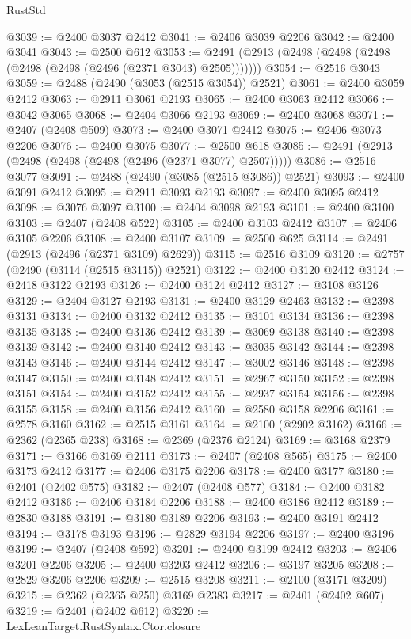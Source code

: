 \begin{lexlean}{RustStd}
\begin{coremodule}
{\begin{coremodule}
{{{{{{{{{{{{{{{{{{{{{{{{{{{{{{{{{{{{{{{{{{{{{{{{{{@3039 := @2400 @3037 @2412
@3041 := @2406 @3039 @2206
@3042 := @2400 @3041
@3043 := @2500 @612
@3053 := @2491 (@2913 (@2498 (@2498 (@2498 (@2498 (@2498 (@2496 (@2371 @3043) @2505)))))))
@3054 := @2516 @3043
@3059 := @2488 (@2490 (@3053 (@2515 @3054)) @2521)
@3061 := @2400 @3059 @2412
@3063 := @2911 @3061 @2193
@3065 := @2400 @3063 @2412
@3066 := @3042 @3065
@3068 := @2404 @3066 @2193
@3069 := @2400 @3068
@3071 := @2407 (@2408 @509)
@3073 := @2400 @3071 @2412
@3075 := @2406 @3073 @2206
@3076 := @2400 @3075
@3077 := @2500 @618
@3085 := @2491 (@2913 (@2498 (@2498 (@2498 (@2496 (@2371 @3077) @2507)))))
@3086 := @2516 @3077
@3091 := @2488 (@2490 (@3085 (@2515 @3086)) @2521)
@3093 := @2400 @3091 @2412
@3095 := @2911 @3093 @2193
@3097 := @2400 @3095 @2412
@3098 := @3076 @3097
@3100 := @2404 @3098 @2193
@3101 := @2400 @3100
@3103 := @2407 (@2408 @522)
@3105 := @2400 @3103 @2412
@3107 := @2406 @3105 @2206
@3108 := @2400 @3107
@3109 := @2500 @625
@3114 := @2491 (@2913 (@2496 (@2371 @3109) @2629))
@3115 := @2516 @3109
@3120 := @2757 (@2490 (@3114 (@2515 @3115)) @2521)
@3122 := @2400 @3120 @2412
@3124 := @2418 @3122 @2193
@3126 := @2400 @3124 @2412
@3127 := @3108 @3126
@3129 := @2404 @3127 @2193
@3131 := @2400 @3129 @2463
@3132 := @2398 @3131
@3134 := @2400 @3132 @2412
@3135 := @3101 @3134
@3136 := @2398 @3135
@3138 := @2400 @3136 @2412
@3139 := @3069 @3138
@3140 := @2398 @3139
@3142 := @2400 @3140 @2412
@3143 := @3035 @3142
@3144 := @2398 @3143
@3146 := @2400 @3144 @2412
@3147 := @3002 @3146
@3148 := @2398 @3147
@3150 := @2400 @3148 @2412
@3151 := @2967 @3150
@3152 := @2398 @3151
@3154 := @2400 @3152 @2412
@3155 := @2937 @3154
@3156 := @2398 @3155
@3158 := @2400 @3156 @2412
@3160 := @2580 @3158 @2206
@3161 := @2578 @3160
@3162 := @2515 @3161
@3164 := @2100 (@2902 @3162)
@3166 := @2362 (@2365 @238)
@3168 := @2369 (@2376 @2124)
@3169 := @3168 @2379
@3171 := @3166 @3169 @2111
@3173 := @2407 (@2408 @565)
@3175 := @2400 @3173 @2412
@3177 := @2406 @3175 @2206
@3178 := @2400 @3177
@3180 := @2401 (@2402 @575)
@3182 := @2407 (@2408 @577)
@3184 := @2400 @3182 @2412
@3186 := @2406 @3184 @2206
@3188 := @2400 @3186 @2412
@3189 := @2830 @3188
@3191 := @3180 @3189 @2206
@3193 := @2400 @3191 @2412
@3194 := @3178 @3193
@3196 := @2829 @3194 @2206
@3197 := @2400 @3196
@3199 := @2407 (@2408 @592)
@3201 := @2400 @3199 @2412
@3203 := @2406 @3201 @2206
@3205 := @2400 @3203 @2412
@3206 := @3197 @3205
@3208 := @2829 @3206 @2206
@3209 := @2515 @3208
@3211 := @2100 (@3171 @3209)
@3215 := @2362 (@2365 @250) @3169 @2383
@3217 := @2401 (@2402 @607)
@3219 := @2401 (@2402 @612)
@3220 := LexLeanTarget.RustSyntax.Ctor.closure
}}}}}}}}}}}}}}}}}}}}}}}}}}}}}}}}}}}}}}}}}}}}}}}}}}
\end{coremodule}}
\end{coremodule}
\end{lexlean}
